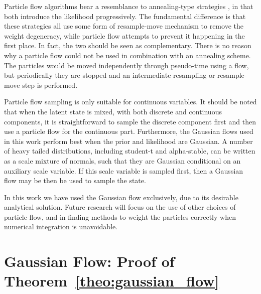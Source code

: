 \documentclass{article}
\begin{document}
Particle flow algorithms bear a resemblance to annealing-type strategies \citep{Neal2001,Deutscher2000,Gall2007,DelMoral2006,Godsill2001b,Oudjane2000}, in that both introduce the likelihood progressively. The fundamental difference is that these strategies all use some form of resample-move mechanism to remove the weight degeneracy, while particle flow attempts to prevent it happening in the first place. In fact, the two should be seen as complementary. There is no reason why a particle flow could not be used in combination with an annealing scheme. The particles would be moved independently through pseudo-time using a flow, but periodically they are stopped and an intermediate resampling or resample-move step is performed.

Particle flow sampling is only suitable for continuous variables. It should be noted that when the latent state is mixed, with both discrete and continuous components, it is straightforward to sample the discrete component first and then use a particle flow for the continuous part. Furthermore, the Gaussian flows used in this work perform best when the prior and likelihood are Gaussian. A number of heavy tailed distributions, including student-t and alpha-stable, can be written as a scale mixture of normals, such that they are Gaussian conditional on an auxiliary scale variable. If this scale variable is sampled first, then a Gaussian flow may be then be used to sample the state.

In this work we have used the Gaussian flow exclusively, due to its desirable analytical solution. Future research will focus on the use of other choices of particle flow, and in finding methods to weight the particles correctly when numerical integration is unavoidable.



\appendix
\singlespacing

\section{Gaussian Flow: Proof of Theorem~\ref{theo:gaussian_flow}} \label{app:gaussian_flow_proof}
\end{document}
